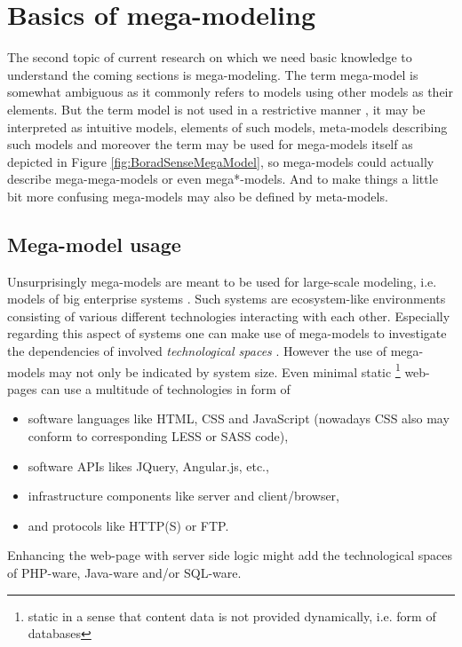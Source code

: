 \section{Basics of mega-modeling}\label{sec:BasicsOfMegamodeling}
The second topic of current research on which we need basic knowledge to understand the coming sections is mega-modeling. The term mega-model is somewhat ambiguous as it commonly refers to models using other models as their elements. But the term model is not used in a restrictive manner \cite{MEGAL2}, it may be interpreted as intuitive models, elements of such models, meta-models describing such models and moreover the term may be used for mega-models itself as depicted in Figure \ref{fig:BoradSenseMegaModel}, so mega-models could actually describe mega-mega-models or even mega*-models. And to make things a little bit more confusing mega-models may also be defined by meta-models.



\subsection{Mega-model usage}\label{subsec:MegaModelUsage}
Unsurprisingly mega-models are meant to be used for large-scale modeling, i.e. models of big enterprise systems \cite{TowardsAMegamodel}. Such systems are ecosystem-like environments consisting of various different technologies interacting with each other. Especially regarding this aspect of systems one can make use of mega-models to investigate the dependencies of involved \textit{technological spaces} \cite{MEGAL1}\cite{MEGAL2}\cite{TowardsAMegamodel}. However the use of mega-models may not only be indicated by system size. Even minimal static \footnote{static in a sense that content data is not provided dynamically, i.e. form of databases} web-pages can use a multitude of technologies in form of
\begin{itemize}
\item software languages like HTML, CSS and JavaScript (nowadays CSS also may conform to corresponding LESS or SASS code),
\item software APIs likes JQuery, Angular.js, etc.,
\item infrastructure components like server and client/browser, 
\item and protocols like HTTP(S) or FTP.
\end{itemize}
Enhancing the web-page with server side logic might add the technological spaces of PHP-ware, Java-ware and/or SQL-ware.

